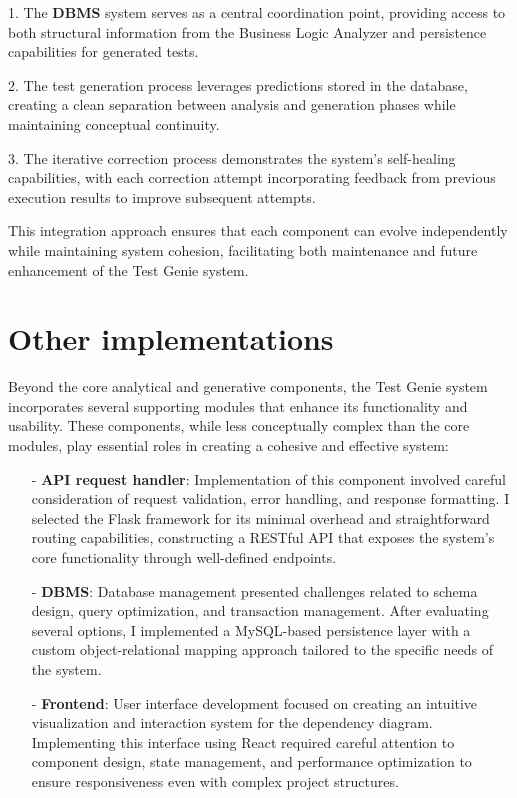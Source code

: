 1. The \textbf{DBMS} system serves as a central coordination point, providing access to both structural information from the Business Logic Analyzer and persistence capabilities for generated tests.

2. The test generation process leverages predictions stored in the database, creating a clean separation between analysis and generation phases while maintaining conceptual continuity.

3. The iterative correction process demonstrates the system's self-healing capabilities, with each correction attempt incorporating feedback from previous execution results to improve subsequent attempts.

This integration approach ensures that each component can evolve independently while maintaining system cohesion, facilitating both maintenance and future enhancement of the Test Genie system.

\section{Other implementations}
Beyond the core analytical and generative components, the Test Genie system incorporates several supporting modules that enhance its functionality and usability. These components, while less conceptually complex than the core modules, play essential roles in creating a cohesive and effective system:

\begin{itemize}
    \item [-] \textbf{API request handler}: Implementation of this component involved careful consideration of request validation, error handling, and response formatting. I selected the Flask framework for its minimal overhead and straightforward routing capabilities, constructing a RESTful API that exposes the system's core functionality through well-defined endpoints.
    
    \item [-] \textbf{DBMS}: Database management presented challenges related to schema design, query optimization, and transaction management. After evaluating several options, I implemented a MySQL-based persistence layer with a custom object-relational mapping approach tailored to the specific needs of the system.
    
    \item [-] \textbf{Frontend}: User interface development focused on creating an intuitive visualization and interaction system for the dependency diagram. Implementing this interface using React required careful attention to component design, state management, and performance optimization to ensure responsiveness even with complex project structures.
\end{itemize}

